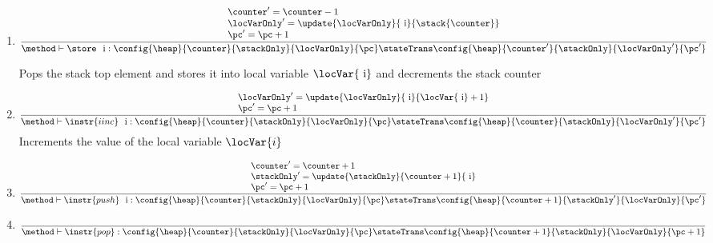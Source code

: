 \begin{itemize}
\begin{enumerate}
        \item \store
        $$ \frac{  \begin{array}{l}
	                \counter' = \counter- 1\\
			\locVarOnly' =	\update{\locVarOnly}{ \mbox{ \rm i} } { \stack{\counter}} \\
			\pc' = \pc + 1
	          \end{array} }
                {\method \vdash  \store \ \mbox{ \rm i} :  \config{\heap}{\counter}{\stackOnly}{\locVarOnly}{\pc} 
		  \stateTrans 
                  \config{\heap}{\counter'}{\stackOnly }{\locVarOnly' }{\pc'} }  $$ 

	     Pops the stack top element \stack{\topStack}  and stores it into local variable $\locVar{\mbox{ \rm i}}$ and  decrements the stack counter 
	     \topStack  
	
        \item  {}

                $$\frac{ \begin{array}{l}	               
			\locVarOnly' =  \update{\locVarOnly}{\mbox{ \rm i} }{ \locVar{\mbox{ \rm i} } + 1}\\
			\pc' = \pc + 1
	          \end{array} } 
	        {\method \vdash \instr{iinc } \ \mbox{ \rm i}  :  \config{\heap}{\counter}{\stackOnly}{\locVarOnly}{\pc} 
		  \stateTrans 
                  \config{\heap}{\counter}{\stackOnly}{\locVarOnly' }{\pc'}  } $$ 
            Increments the value of the local variable $\locVar{i}$ 
	
	\item \push
	       $$\frac{\begin{array}{l}
	                \counter' = \counter + 1\\
			\stackOnly' = \update{\stackOnly}{\counter +  1}{\mbox{ \rm i}  }\\
			\pc' = \pc + 1
	          \end{array}  } 
	        {\method \vdash \instr{push} \ \mbox{ \rm i}  :  \config{\heap}{\counter}{\stackOnly}{\locVarOnly}{\pc} 
		                                  \stateTrans  
						  \config{\heap}{\counter + 1}{\stackOnly' }
						  {\locVarOnly}
						  {\pc'}  }  $$
     
      \item {} 
       $$\frac{ } 
	        {\method \vdash \instr{pop}   :  \config{\heap}{\counter}{\stackOnly}{\locVarOnly}{\pc} 
		                                  \stateTrans  
						  \config{\heap}{\counter + 1}{\stackOnly}
						  {\locVarOnly}
						  {\pc + 1}  }  $$
    \end{enumerate}



\end{itemize}
